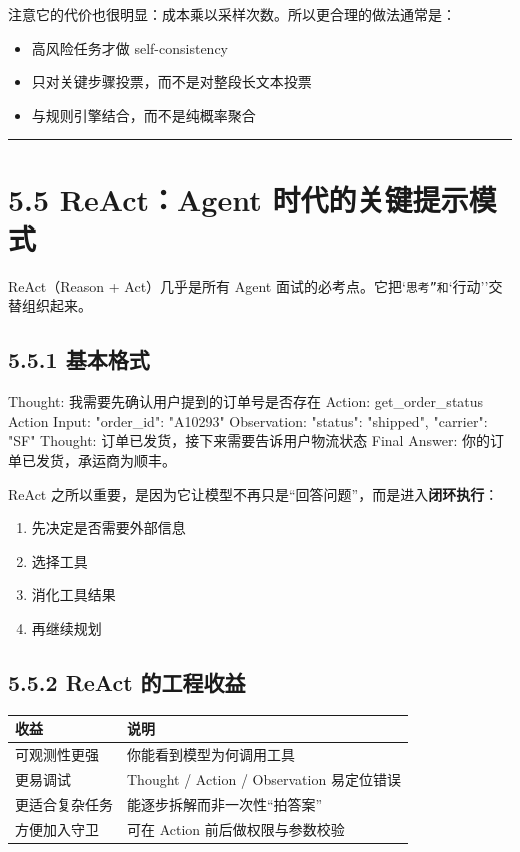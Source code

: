 注意它的代价也很明显：成本乘以采样次数。所以更合理的做法通常是：


\begin{itemize}[leftmargin=2em]
\item 高风险任务才做 self-consistency
\item 只对关键步骤投票，而不是对整段长文本投票
\item 与规则引擎结合，而不是纯概率聚合
\end{itemize}

\bigskip\hrule\bigskip

\section{5.5 ReAct：Agent 时代的关键提示模式}

ReAct（Reason + Act）几乎是所有 Agent 面试的必考点。它把`\texttt{思考''和}`行动''交替组织起来。


\subsection{5.5.1 基本格式}

\begin{codeblock}
Thought: 我需要先确认用户提到的订单号是否存在
Action: get_order_status
Action Input: {"order_id": "A10293"}
Observation: {"status": "shipped", "carrier": "SF"}
Thought: 订单已发货，接下来需要告诉用户物流状态
Final Answer: 你的订单已发货，承运商为顺丰。
\end{codeblock}

ReAct 之所以重要，是因为它让模型不再只是``回答问题''，而是进入\textbf{闭环执行}：


\begin{enumerate}[leftmargin=2em]
\item 先决定是否需要外部信息
\item 选择工具
\item 消化工具结果
\item 再继续规划
\end{enumerate}

\subsection{5.5.2 ReAct 的工程收益}

\begingroup
\scriptsize
\setlength{\tabcolsep}{3pt}
\begin{longtable}{|p{}|p{}|}
\hline
收益 & 说明 \\ \hline
可观测性更强 & 你能看到模型为何调用工具 \\ \hline
更易调试 & Thought / Action / Observation 易定位错误 \\ \hline
更适合复杂任务 & 能逐步拆解而非一次性``拍答案'' \\ \hline
方便加入守卫 & 可在 Action 前后做权限与参数校验 \\ \hline
\end{longtable}
\endgroup

